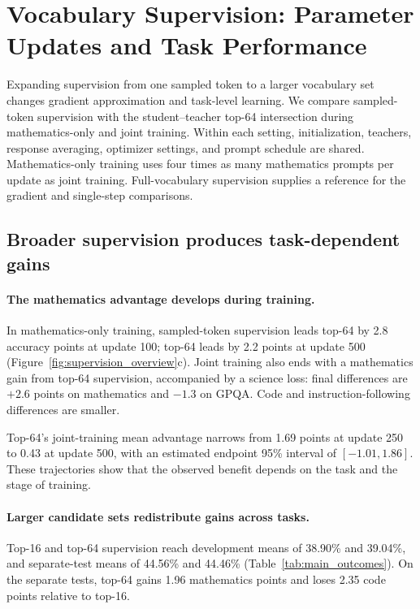 \section{Vocabulary Supervision: Parameter Updates and Task Performance}
\label{sec:density}

Expanding supervision from one sampled token to a larger vocabulary set changes gradient approximation and task-level learning. We compare sampled-token supervision with the student--teacher top-64 intersection during mathematics-only and joint training. Within each setting, initialization, teachers, response averaging, optimizer settings, and prompt schedule are shared. Mathematics-only training uses four times as many mathematics prompts per update as joint training. Full-vocabulary supervision supplies a reference for the gradient and single-step comparisons.

\subsection{Broader supervision produces task-dependent gains}

\paragraph{The mathematics advantage develops during training.}
In mathematics-only training, sampled-token supervision leads top-64 by 2.8 accuracy points at update 100; top-64 leads by 2.2 points at update 500 (Figure~\ref{fig:supervision_overview}c). Joint training also ends with a mathematics gain from top-64 supervision, accompanied by a science loss: final differences are $+2.6$ points on mathematics and $-1.3$ on GPQA. Code and instruction-following differences are smaller.

Top-64's joint-training mean advantage narrows from 1.69 points at update 250 to 0.43 at update 500, with an estimated endpoint 95\% interval of $[-1.01,1.86]$. These trajectories show that the observed benefit depends on the task and the stage of training.

\paragraph{Larger candidate sets redistribute gains across tasks.}
Top-16 and top-64 supervision reach development means of 38.90\% and 39.04\%, and separate-test means of 44.56\% and 44.46\% (Table~\ref{tab:main_outcomes}). On the separate tests, top-64 gains 1.96 mathematics points and loses 2.35 code points relative to top-16.

